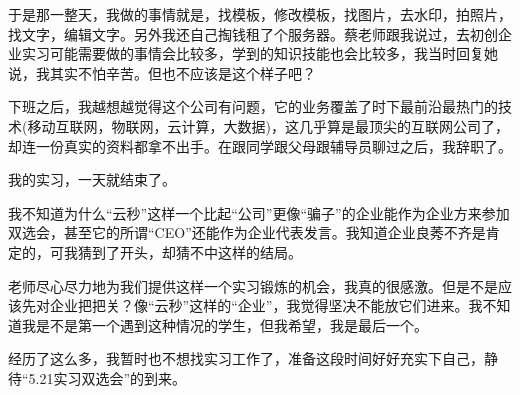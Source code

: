\documentclass[	10pt，a4paper， UTF8]{ctexart}
\begin{document}
于是那一整天，我做的事情就是，找模板，修改模板，找图片，去水印，拍照片，找文字，编辑文字。另外我还自己掏钱租了个服务器。蔡老师跟我说过，去初创企业实习可能需要做的事情会比较多，学到的知识技能也会比较多，我当时回复她说，我其实不怕辛苦。但也不应该是这个样子吧？

下班之后，我越想越觉得这个公司有问题，它的业务覆盖了时下最前沿最热门的技术(移动互联网，物联网，云计算，大数据)，这几乎算是最顶尖的互联网公司了，却连一份真实的资料都拿不出手。在跟同学跟父母跟辅导员聊过之后，我辞职了。

我的实习，一天就结束了。

我不知道为什么“云秒”这样一个比起“公司”更像“骗子”的企业能作为企业方来参加双选会，甚至它的所谓“CEO”还能作为企业代表发言。我知道企业良莠不齐是肯定的，可我猜到了开头，却猜不中这样的结局。

老师尽心尽力地为我们提供这样一个实习锻炼的机会，我真的很感激。但是不是应该先对企业把把关？像“云秒”这样的“企业”，我觉得坚决不能放它们进来。我不知道我是不是第一个遇到这种情况的学生，但我希望，我是最后一个。

经历了这么多，我暂时也不想找实习工作了，准备这段时间好好充实下自己，静待“5.21实习双选会”的到来。
\end{document}
